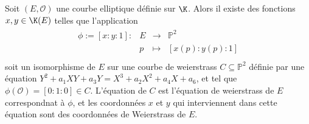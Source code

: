        \begin{prop}
            Soit $(E, \mathcal{O})$ une courbe elliptique définie sur $\K$. Alors il existe des fonctions $x,y \in \K(E)$ telles que l'application
            \begin{align*}
                \begin{array}{cccc}
                    \phi := [x : y : 1] : & E & \to & \mathbb{P}^2 \\
                    & p & \mapsto & [x(p) : y(p) : 1] \\
                \end{array}
            \end{align*}
            soit un isomorphisme de $E$ sur une courbe de weierstrass $C \subseteq \mathbb{P}^2$ définie par une équation $Y^2 + a_1XY + a_3Y = X^3 + a_2X^2 + a_4X + a_6$, et tel que $\phi(\mathcal{O}) = [0 : 1 : 0] \in C$. L'équation de $C$ est l'équation de weierstrass de $E$ correspondnat à $\phi$, et les coordonnées $x$ et $y$ qui interviennent dans cette équation sont des coordonnées de Weierstrass de $E$.
        \end{prop}
